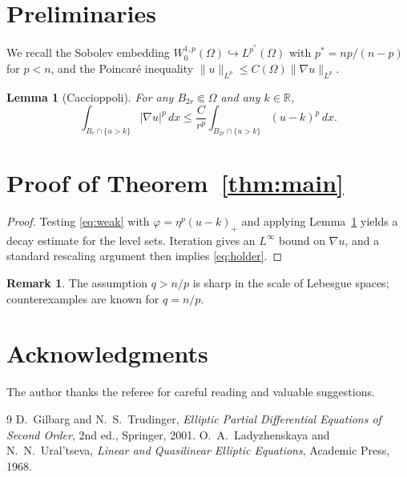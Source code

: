 \documentclass[11pt,reqno]{amsart}
\newtheorem{lemma}[theorem]{Lemma}
\theoremstyle{definition}
\newtheorem{remark}[theorem]{Remark}
\newcommand{\R}{\mathbb{R}}
\newcommand{\Om}{\Omega}
\begin{document}
\section{Preliminaries}\label{sec:pre}

We recall the Sobolev embedding $W^{1,p}_0(\Om)\hookrightarrow L^{p^*}(\Om)$
with $p^*=np/(n-p)$ for $p<n$, and the Poincaré inequality
$\|u\|_{L^p}\le C(\Om)\|\nabla u\|_{L^p}$.

\begin{lemma}[Caccioppoli]\label{lem:cacc}
For any $B_{2r}\Subset\Om$ and any $k\in\R$,
\begin{equation}
  \int_{B_r\cap\{u>k\}}|\nabla u|^p\,dx
  \le \frac{C}{r^p}\int_{B_{2r}\cap\{u>k\}}(u-k)^p\,dx .
\end{equation}
\end{lemma}

\section{Proof of Theorem~\ref{thm:main}}\label{sec:proof}

\begin{proof}[Proof]
Testing \eqref{eq:weak} with $\varphi=\eta^p(u-k)_+$ and applying
Lemma~\ref{lem:cacc} yields a decay estimate for the level sets.
Iteration gives an $L^\infty$ bound on $\nabla u$, and a standard
rescaling argument then implies \eqref{eq:holder}.
\end{proof}

\begin{remark}
The assumption $q>n/p$ is sharp in the scale of Lebesgue spaces;
counterexamples are known for $q=n/p$.
\end{remark}

\section*{Acknowledgments}
The author thanks the referee for careful reading and valuable suggestions.

\begin{thebibliography}{9}
 D.~Gilbarg and N.~S.~Trudinger, \emph{Elliptic Partial Differential
  Equations of Second Order}, 2nd ed., Springer, 2001.
 O.~A.~Ladyzhenskaya and N.~N.~Ural'tseva, \emph{Linear and Quasilinear
  Elliptic Equations}, Academic Press, 1968.
\end{thebibliography}
\end{document}
